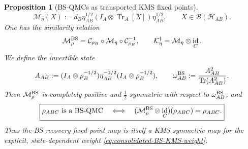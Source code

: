 \documentclass[11pt]{article}
\newtheorem{proposition}[proposition]{Proposition}
\theoremstyle{remark}
\DeclareMathOperator{\id}{id}
\newcommand{\1}{\mathbbm{1}}
\begin{document}
\begin{proposition}[BS-QMCs as transported KMS fixed points]
\begin{equation}
 \mathcal M_\eta(X)
 :=d_B\eta_{AB}^{1/2}(I_A\otimes\operatorname{Tr}_A[X])\eta_{AB}^{1/2},
 \qquad X\in\mathcal B(\mathcal H_{AB}).
 \label{eq:consolidated-shadow-fixed-point-map}
\end{equation}
One has the similarity relation
\begin{equation}
 \mathcal M_\rho^{\rm BS}
 =\mathcal C_{\rho_B}\circ\mathcal M_\eta
  \circ\mathcal C_{\rho_B}^{-1},
 \qquad
 \mathcal K_\eta^\dagger=\mathcal M_\eta\otimes\id_C.
 \label{eq:consolidated-BS-KMS-similarity}
\end{equation}
We define the invertible state
\begin{equation}
 A_{AB}:=(I_A\otimes\rho_B^{-1/2})\eta_{AB}^{-1/2}
          (I_A\otimes\rho_B^{-1/2}),
 \qquad
 \omega_{AB}^{\rm BS}:=\frac{A_{AB}^2}{\operatorname{Tr}(A_{AB}^2)}.
 \label{eq:consolidated-BS-KMS-weight}
\end{equation}
Then $\mathcal M_\rho^{\rm BS}$ is completely positive and
$\frac12$-symmetric with respect to $\omega_{AB}^{\rm BS}$, and
\begin{equation}
 \boxed{
 \rho_{ABC}\text{ is a BS-QMC}
 \quad\Longleftrightarrow\quad
 (\mathcal M_\rho^{\rm BS}\otimes\id_C)(\rho_{ABC})
 =\rho_{ABC}.}
 \label{eq:consolidated-direct-BS-KMS-fixed-point}
\end{equation}
Thus the BS recovery fixed-point map is itself a KMS-symmetric map
for the explicit, state-dependent weight
\eqref{eq:consolidated-BS-KMS-weight}.
\end{proposition}
\end{document}
